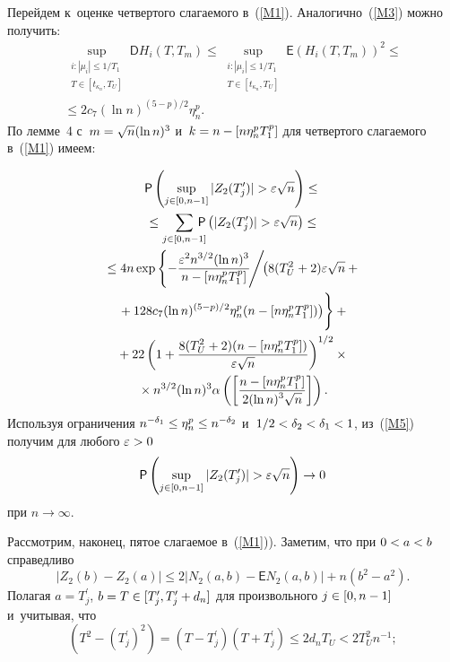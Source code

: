 \begin{multicols}{2}
Перейдем к~оценке четвертого слагаемого в~(\ref{M1}). Аналогично~(\ref{M3}) 
можно получить:
\begin{multline}
\label{M10}
\!\!\sup\limits_{\substack{i: |\mu_i| \leq 1/T_1 \\ T\in [t_{\kappa_n}, T_U]}} \!{\mathsf D} 
H_i (T, T_m)  \leq \!\sup\limits_{\substack{i: |\mu_i| \leq 1/T_1 \\ T\in 
[t_{\kappa_n}, T_U]}} \!{\mathsf E} \left(H_i (T, T_m)\right)^2  \leq{}\\
{}\leq 2 c_7 (\ln n)^{(5-p)/2} \eta_n^p.
\end{multline}
По лемме~4 с~$m \hm= \sqrt{n} (\ln n)^3$ и~$k \hm= n-[n\eta_n^p T_1^p]$ 
для четвертого слагаемого в~(\ref{M1}) имеем:

\noindent
\begin{multline}
\p \left(\sup\limits_{j \in [0, n-1]} |Z_2(T_j^\prime)| > \eps\sqrt{n}\right) 
\leq {}\\
{}\leq \sum\limits_{j \in [0, n-1]} \hspace*{-3mm}\p \left( |Z_2(T_j^\prime)| > \varepsilon\sqrt{n}\right)\leq{}\\
{}\leq 4 n \exp \left\{ - \fr{\eps^2 n^{3/2} (\ln n)^3}{n-[n\eta_n^p T_1^p]}\!\Bigg/\! \big( 8 (T_U^2+2)\eps\sqrt{n} +{}\right.\\
\left.{}+ 128 c_7 (\ln n)^{(5-p)/2} \eta_n^p  (n-
[n\eta_n^p T_1^p])\big) 
\vphantom{ \fr{\eps^2 n^{3/2} (\ln n)^3}{n-[n\eta_n^p T_1^p]}}
\right\} +{}\\
{}
+ 22 \left(1+\fr{8(T_U^2+2) (n-[n\eta_n^p T_1^p])}{\eps 
\sqrt{n}}\right)^{1/2}\times{}\\
{}\times n^{3/2} (\ln n)^3 \alpha\left(\left[\fr{n-[n\eta_n^p 
T_1^p]}{2 (\ln n)^3 \sqrt{n}}\right]\right).
\label{M5}
\end{multline}
Используя ограничения $n^{-\delta_1}\hm\leq \eta_n^p \leq n^{-\delta_2}$ 
и~$1/2\hm<\delta_2\hm<\delta_1\hm<1$, из~(\ref{M5}) получим для любого $\eps\hm>0$
$$
{\sf P} \left(\sup\limits_{j \in [0, n-1]} |Z_2(T_j^\prime)| > \varepsilon\sqrt{n}\right) 
\to 0
$$
при $n \to \infty$.

Рассмотрим, наконец, пятое слагаемое в~(\ref{M1})). Заметим, что при $0\hm< a \hm< b$ 
справедливо
$$
|Z_2(b)-Z_2(a)| \leq 2 |N_2(a,b)-{\mathsf E} N_2(a,b)| + n (b^2-a^2).
$$
Полагая $a = T_j^\prime$, $b \hm= T \hm\in [T_j^\prime, T_j^\prime+d_n]$ для 
произвольного $j \hm\in [0, n-1]$ и~учитывая, что
$$
(T^2 - (T_j^\prime )^2) = (T - T_j^\prime)(T+ T_j^\prime ) \leq  2 d_n T_U < 2 
T_U^2 n^{-1}; 
$$

\vspace*{-12pt}


\end{multicols}
